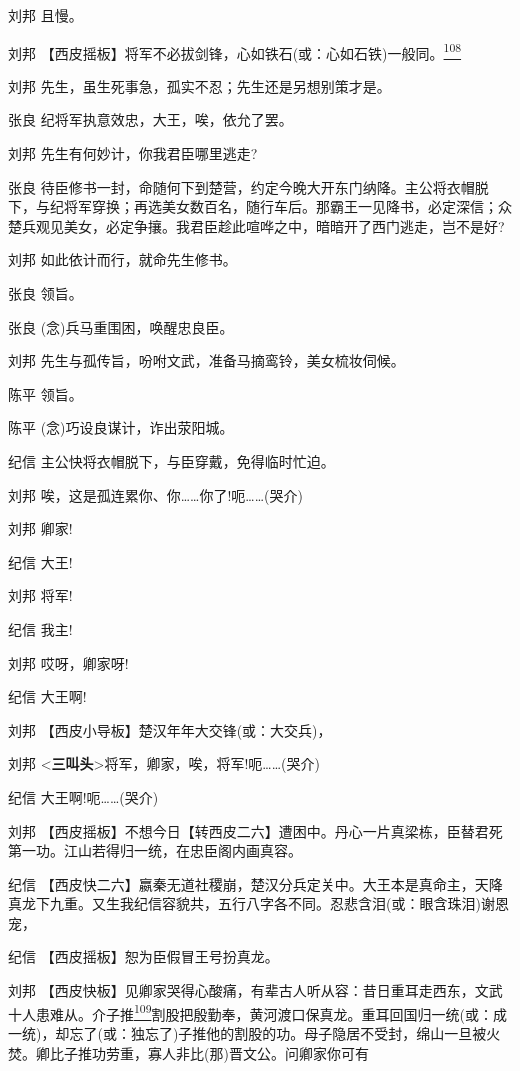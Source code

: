 刘邦 且慢。

刘邦
【西皮摇板】将军不必拔剑锋，心如铁石(或：心如石铁)一般同。\protect\hyperlink{fn108}{\textsuperscript{108}}

刘邦 先生，虽生死事急，孤实不忍；先生还是另想别策才是。

张良 纪将军执意效忠，大王，唉，依允了罢。

刘邦 先生有何妙计，你我君臣哪里逃走?

张良
待臣修书一封，命随何下到楚营，约定今晚大开东门纳降。主公将衣帽脱下，与纪将军穿换；再选美女数百名，随行车后。那霸王一见降书，必定深信；众楚兵观见美女，必定争攘。我君臣趁此喧哗之中，暗暗开了西门逃走，岂不是好?

刘邦 如此依计而行，就命先生修书。

张良 领旨。

张良 (念)兵马重围困，唤醒忠良臣。

刘邦 先生与孤传旨，吩咐文武，准备马摘鸾铃，美女梳妆伺候。

陈平 领旨。

陈平 (念)巧设良谋计，诈出荥阳城。

纪信 主公快将衣帽脱下，与臣穿戴，免得临时忙迫。

刘邦 唉，这是孤连累你、你\ldots{}\ldots{}你了!呃\ldots{}\ldots{}(哭介)

刘邦 卿家!

纪信 大王!

刘邦 将军!

纪信 我主!

刘邦 哎呀，卿家呀!

纪信 大王啊!

刘邦 【西皮小导板】楚汉年年大交锋(或：大交兵)，

刘邦
\textless{}\textbf{三叫头}\textgreater{}将军，卿家，唉，将军!呃\ldots{}\ldots{}(哭介)

纪信 大王啊!呃\ldots{}\ldots{}(哭介)

刘邦
【西皮摇板】不想今日【转西皮二六】遭困中。丹心一片真梁栋，臣替君死第一功。江山若得归一统，在忠臣阁内画真容。

纪信
【西皮快二六】嬴秦无道社稷崩，楚汉分兵定关中。大王本是真命主，天降真龙下九重。又生我纪信容貌共，五行八字各不同。忍悲含泪(或：眼含珠泪)谢恩宠，

纪信 【西皮摇板】恕为臣假冒王号扮真龙。

刘邦
【西皮快板】见卿家哭得心酸痛，有辈古人听从容：昔日重耳走西东，文武十人患难从。介子推\protect\hyperlink{fn109}{\textsuperscript{109}}割股把殷勤奉，黄河渡口保真龙。重耳回国归一统(或：成一统)，却忘了(或：独忘了)子推他的割股的功。母子隐居不受封，绵山一旦被火焚。卿比子推功劳重，寡人非比(那)晋文公。问卿家你可有

